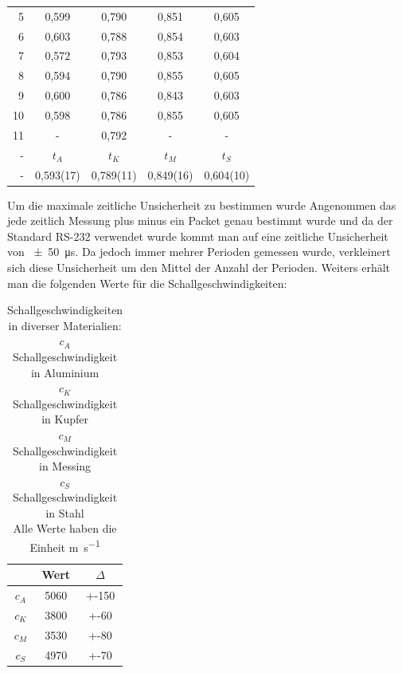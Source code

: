 \documentclass[11pt]{scrartcl}
\begin{document}
\begin{table}[H]
\begin{tabular}{r|S[table-format=1.3(3)]|S[table-format=1.3(3)]|S[table-format=1.3(3)]|S[table-format=1.3(3)]}
       5  & 0,599     & 0,790     & 0,851     & 0,605     \\
       6  & 0,603     & 0,788     & 0,854     & 0,603     \\
       7  & 0,572     & 0,793     & 0,853     & 0,604     \\
       8  & 0,594     & 0,790     & 0,855     & 0,605     \\
       9  & 0,600     & 0,786     & 0,843     & 0,603     \\
       10 & 0,598     & 0,786     & 0,855     & 0,605     \\
       11 & {-}       & 0,792     & {-}       & {-}       \\ \hline \hline
       -  & {$t_{A}$}   & {$t_{K}$}   & {$t_{M}$}   & {$t_{S}$}   \\ \hline
       -  & 0,593(17) & 0,789(11)  & 0,849(16)  & 0,604(10)  \\ \hline \hline
    \end{tabular}
\end{table}

Um die maximale zeitliche Unsicherheit zu bestimmen
wurde Angenommen das jede zeitlich Messung plus minus ein Packet genau
bestimmt wurde und da der Standard RS-232 verwendet wurde kommt man
auf eine zeitliche Unsicherheit von \SI{+-50}{\us}. Da jedoch immer mehrer
Perioden gemessen wurde, verkleinert sich diese Unsicherheit um den
Mittel der Anzahl der Perioden.
Weiters erhält man die folgenden Werte für die Schallgeschwindigkeiten:

\begin{table}[H]
    \centering
    \caption{Schallgeschwindigkeiten in diverser Materialien:\\
    $c_A$ Schallgeschwindigkeit in Aluminium \\
    $c_K$ Schallgeschwindigkeit in Kupfer \\
    $c_M$ Schallgeschwindigkeit in Messing \\
    $c_S$ Schallgeschwindigkeit in Stahl \\
    Alle Werte haben die Einheit \si{\meter\per\second}}
    \label{tab:schallgeschwindigkeiten}
    \begin{tabular}{c|S[table-format=4.0(0)]|S[table-format=4.0(0)]}
        {}    & {Wert} & {$\Delta$} \\ \hline
        $c_A$ & 5060 & +-150   \\
        $c_K$ & 3800 & +-60  \\
        $c_M$ & 3530 & +-80  \\
        $c_S$ & 4970 & +-70  \\
    \end{tabular}
\end{table}
\end{document}
